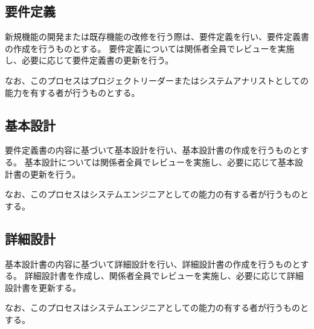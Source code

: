 




\subsection{要件定義}
新規機能の開発または既存機能の改修を行う際は、要件定義を行い、要件定義書の作成を行うものとする。
要件定義については関係者全員でレビューを実施し、必要に応じて要件定義書の更新を行う。

なお、このプロセスはプロジェクトリーダーまたはシステムアナリストとしての能力を有する者が行うものとする。

\subsection{基本設計}
要件定義書の内容に基づいて基本設計を行い、基本設計書の作成を行うものとする。
基本設計については関係者全員でレビューを実施し、必要に応じて基本設計書の更新を行う。

なお、このプロセスはシステムエンジニアとしての能力の有する者が行うものとする。

\subsection{詳細設計}
基本設計書の内容に基づいて詳細設計を行い、詳細設計書の作成を行うものとする。
詳細設計書を作成し、関係者全員でレビューを実施し、必要に応じて詳細設計書を更新する。

なお、このプロセスはシステムエンジニアとしての能力の有する者が行うものとする。

